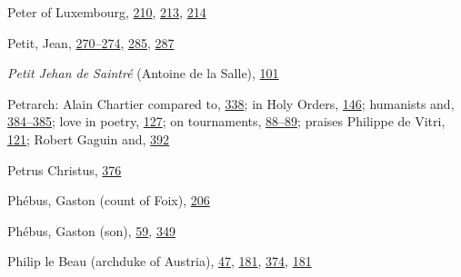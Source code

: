 Peter of Luxembourg,
\protect\hyperlink{14_Chapter_Seven__THE_PIOUS_PERSONA.xhtmlux5cux23page_210}{210},
\protect\hyperlink{14_Chapter_Seven__THE_PIOUS_PERSONA.xhtmlux5cux23page_213}{213},
\protect\hyperlink{14_Chapter_Seven__THE_PIOUS_PERSONA.xhtmlux5cux23page_214}{214}

Petit, Jean,
\protect\hyperlink{18_Chapter_Eleven__THE_FORMS_OF_THO.xhtmlux5cux23page_270}{270--}\protect\hyperlink{18_Chapter_Eleven__THE_FORMS_OF_THO.xhtmlux5cux23page_274}{274},
\protect\hyperlink{18_Chapter_Eleven__THE_FORMS_OF_THO.xhtmlux5cux23page_285}{285},
\protect\hyperlink{18_Chapter_Eleven__THE_FORMS_OF_THO.xhtmlux5cux23page_287}{287}

\emph{Petit Jehan de Saintré} (Antoine de la Salle),
\protect\hyperlink{10_Chapter_Three__THE_HEROIC_DREAM.xhtmlux5cux23page_101}{101}

Petrarch: Alain Chartier compared to,
\protect\hyperlink{21_Chapter_Thirteen__IMAGE_AND_WORD.xhtmlux5cux23page_338}{338};
in Holy Orders,
\protect\hyperlink{11_Chapter_Four__THE_FORMS_OF_LOVE.xhtmlux5cux23page_146}{146};
humanists and,
\protect\hyperlink{22_Chapter_Fourteen__THE_COMING_OF.xhtmlux5cux23page_384}{384--}\protect\hyperlink{22_Chapter_Fourteen__THE_COMING_OF.xhtmlux5cux23page_385}{385};
love in poetry,
\protect\hyperlink{11_Chapter_Four__THE_FORMS_OF_LOVE.xhtmlux5cux23page_127}{127};
on tournaments,
\protect\hyperlink{10_Chapter_Three__THE_HEROIC_DREAM.xhtmlux5cux23page_88}{88--}\protect\hyperlink{10_Chapter_Three__THE_HEROIC_DREAM.xhtmlux5cux23page_89}{89};
praises Philippe de Vitri,
\protect\hyperlink{10_Chapter_Three__THE_HEROIC_DREAM.xhtmlux5cux23page_121}{121};
Robert Gaguin and,
\protect\hyperlink{22_Chapter_Fourteen__THE_COMING_OF.xhtmlux5cux23page_392}{392}

Petrus Christus,
\protect\hyperlink{21_Chapter_Thirteen__IMAGE_AND_WORD.xhtmlux5cux23page_376}{376}

Phébus, Gaston (count of Foix),
\protect\hyperlink{14_Chapter_Seven__THE_PIOUS_PERSONA.xhtmlux5cux23page_206}{206}

Phébus, Gaston (son),
\protect\hyperlink{09_Chapter_Two__THE_CRAVING_FOR_A_M.xhtmlux5cux23page_59}{59},
\protect\hyperlink{21_Chapter_Thirteen__IMAGE_AND_WORD.xhtmlux5cux23page_349}{349}

Philip le Beau (archduke of Austria),
\protect\hyperlink{09_Chapter_Two__THE_CRAVING_FOR_A_M.xhtmlux5cux23page_47}{47},
\protect\hyperlink{13_Chapter_Six__THE_DEPICTION_OF_TH.xhtmlux5cux23page_181}{181},
\protect\hyperlink{21_Chapter_Thirteen__IMAGE_AND_WORD.xhtmlux5cux23page_374}{374},
\protect\hyperlink{13_Chapter_Six__THE_DEPICTION_OF_TH.xhtmlux5cux23page_181}{181}

